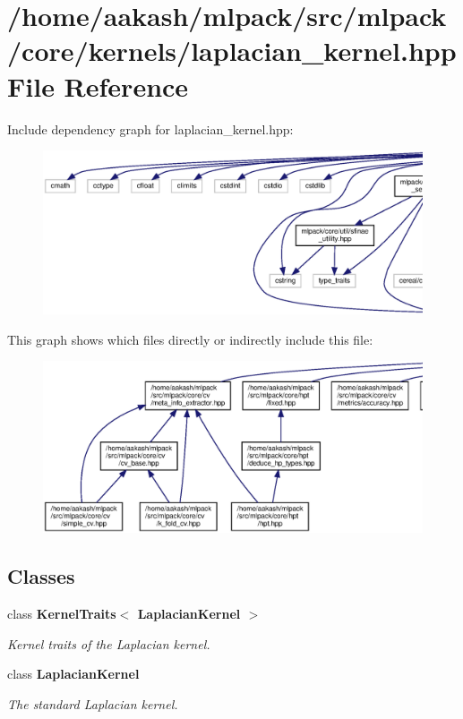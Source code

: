 \section{/home/aakash/mlpack/src/mlpack/core/kernels/laplacian\+\_\+kernel.hpp File Reference}
\label{laplacian__kernel_8hpp}
Include dependency graph for laplacian\+\_\+kernel.\+hpp\+:
\nopagebreak
\begin{figure}[H]
\begin{center}
\leavevmode
\includegraphics[width=350pt]{laplacian__kernel_8hpp__incl}
\end{center}
\end{figure}
This graph shows which files directly or indirectly include this file\+:
\nopagebreak
\begin{figure}[H]
\begin{center}
\leavevmode
\includegraphics[width=350pt]{laplacian__kernel_8hpp__dep__incl}
\end{center}
\end{figure}
\subsection*{Classes}
\begin{DoxyCompactItemize}
\item 
class \textbf{ Kernel\+Traits$<$ Laplacian\+Kernel $>$}
\begin{DoxyCompactList}\small\item\em Kernel traits of the Laplacian kernel. \end{DoxyCompactList}\item 
class \textbf{ Laplacian\+Kernel}
\begin{DoxyCompactList}\small\item\em The standard Laplacian kernel. \end{DoxyCompactList}\end{DoxyCompactItemize}
